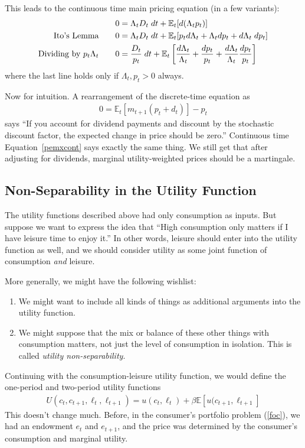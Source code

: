 \documentclass[12pt]{article}
\theoremstyle{plain}
\theoremstyle{definition}
\theoremstyle{remark}
\begin{document}
This leads to the continuous time main pricing equation (in a few
variants):
\begin{align}
  0 &= \Lambda_t D_t \; dt + \mathbb{E}_t[d(\Lambda_t p_t)]
  \label{pemxcont}\\
  \text{Ito's Lemma}\qquad
  0 &= \Lambda_t D_t \; dt
  + \mathbb{E}_t[p_t d\Lambda_t + \Lambda_t dp_t + d\Lambda_t\; dp_t]
  \notag\\
  \text{Dividing by $p_t\Lambda_t$}\qquad
  0 &= \frac{D_t}{p_t} \; dt
  + \mathbb{E}_t\left[\frac{d\Lambda_t}{\Lambda_t}
  + \frac{dp_t}{p_t} + \frac{d\Lambda_t}{\Lambda_t}\frac{dp_t}{p_t}
  \right]
  \notag
\end{align}
where the last line holds only if $\Lambda_t,p_t>0$ always.

Now for intuition. A rearrangement of the discrete-time equation as
\begin{align*}
  0=\mathbb{E}_t[m_{t+1}(p_t+d_t)]-p_t
\end{align*}
says ``If you account for dividend payments and discount by the
stochastic discount factor, the expected change in price should be
zero.'' Continuous time Equation~\ref{pemxcont} says exactly the same
thing.  We still get that after adjusting for dividends, marginal
utility-weighted prices should be a martingale.


\subsection{Non-Separability in the Utility Function}

The utility functions described above had only consumption as inputs.
But suppose we want to express the idea that ``High consumption only
matters if I have leisure time to enjoy it.'' In other words, leisure
should enter into the utility function as well, and we should consider
utility as some joint function of consumption \emph{and} leisure.

More generally, we might have the following wishlist:
\begin{enumerate}
  \item We might want to include all kinds of things as additional
    arguments into the utility function.
  \item We might suppose that the mix or balance of these other things
    with consumption matters, not just the level of consumption in
    isolation. This is called \emph{utility non-separability}.
\end{enumerate}
Continuing with the consumption-leisure utility function, we would
define the one-period and two-period utility functions
\begin{align*}
  U(c_t,c_{t+1},\ell_t,\ell_{t+1})
  =
  u(c_t,\ell_t) + \beta \mathbb{E}[u(c_{t+1},\ell_{t+1}]
\end{align*}
This doesn't change much. Before, in the consumer's portfolio problem
(\ref{foc}), we had an endowment $e_t$ and $e_{t+1}$, and the price was
determined by the consumer's consumption and marginal utility.
\end{document}

